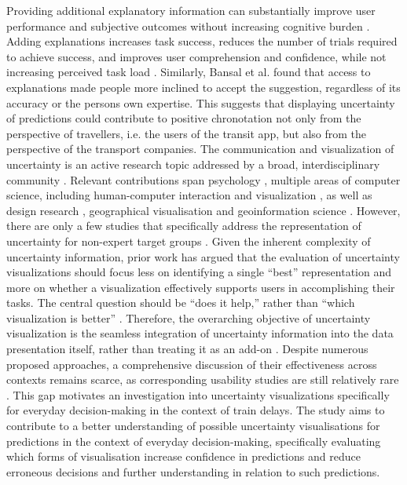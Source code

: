 \documentclass[final,journal,a4paper]{IEEEtran}
\begin{document}
\newline
Providing additional explanatory information can substantially improve user performance and subjective outcomes without increasing cognitive burden \cite{Yang2020, Chung2020, Chakraborty2025}. Adding explanations increases task success, reduces the number of trials required to achieve success, and improves user comprehension and confidence, while not increasing perceived task load \cite{Chakraborty2025}. Similarly, Bansal et al. \cite{Bansal2021} found that access to explanations made people more inclined to accept the suggestion, regardless of its accuracy or the persons own expertise. This suggests that displaying uncertainty of predictions could contribute to positive chronotation not only from the perspective of travellers, i.e. the users of the transit app, but also from the perspective of the transport companies.
\newline
The communication and visualization of uncertainty is an active research topic addressed by a broad, interdisciplinary community \cite{Skeels2008}. Relevant contributions span psychology \cite{Jenkins2020}, multiple areas of computer science, including human-computer interaction and visualization \cite{Inkpen2023, Dong2024}, as well as design research \cite{Kay2016}, geographical visualisation and geoinformation science \cite{Skeels2008}. However, there are only a few studies that specifically address the representation of uncertainty for non-expert target groups \cite{Kay2016}. Given the inherent complexity of uncertainty information, prior work has argued that the evaluation of uncertainty visualizations should focus less on identifying a single “best” representation and more on whether a visualization effectively supports users in accomplishing their tasks. The central question should be “does it help,” rather than “which visualization is better” \cite{Harrower}. Therefore, the overarching objective of uncertainty visualization is the seamless integration of uncertainty information into the data presentation itself, rather than treating it as an add-on \cite{Potter2010visualizationofuncertainty}. Despite numerous proposed approaches, a comprehensive discussion of their effectiveness across contexts remains scarce, as corresponding usability studies are still relatively rare \cite{GrietheSchumann}. This gap motivates an investigation into uncertainty visualizations specifically for everyday decision-making in the context of train delays. The study aims to contribute to a better understanding of possible uncertainty visualisations for predictions in the context of everyday decision-making, specifically evaluating which forms of visualisation increase confidence in predictions and reduce erroneous decisions and further understanding in relation to such predictions.
\end{document}
